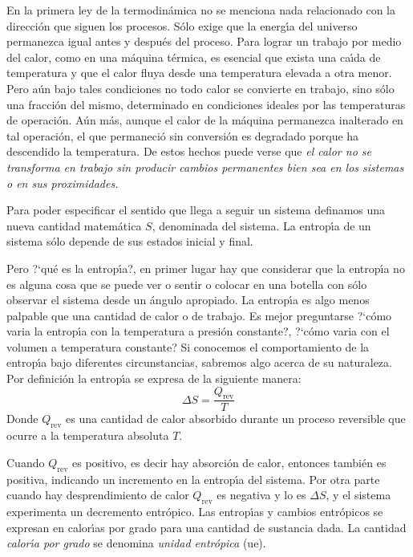  En la primera ley de la termodin\'amica no se menciona nada relacionado con la direcci\'on que siguen los procesos. S\'olo exige que la energ\'{\i}a del universo permanezca igual antes y  despu\'es del proceso. Para lograr un trabajo por medio del calor, como en una m\'aquina t\'ermica, es esencial que exista una ca\'{\i}da de temperatura y que el calor fluya desde una tempe\-ratura elevada a otra menor. Pero a\'un bajo tales condiciones no todo calor se convierte en trabajo, sino s\'olo una fracci\'on del mismo, determinado en condiciones ideales por las temperaturas de operaci\'on. A\'un m\'as, aunque el calor de la m\'aquina permanezca inalterado en tal operaci\'on, el que permaneci\'o sin conversi\'on es degradado porque ha descendido la temperatura. De estos hechos puede verse que \textit{el calor no se transforma en trabajo sin producir cambios permanentes bien sea en los sistemas o en sus proximidades.}

Para poder especificar el sentido que llega a seguir un sistema definamos una nueva cantidad matem\'atica $S$, denominada \textit{} del sistema. La entrop\'{\i}a  de un sistema s\'olo depende de sus estados inicial y final.

Pero ?`qu\'e es la entrop\'{\i}a?, en primer lugar hay que considerar que la entrop\'{\i}a no es alguna cosa que se puede ver o sentir o colocar en una botella con s\'olo observar el sistema desde un \'angulo apropiado. La entrop\'{\i}a es algo menos palpable que una cantidad de calor o de trabajo. Es mejor preguntarse ?`c\'omo varia la entrop\'{\i}a con la temperatura a presi\'on constante?, ?`c\'omo varia con el volumen a temperatura constante? Si conocemos el comportamiento de la entrop\'{\i}a bajo diferentes circunstancias, sabremos algo acerca de su naturaleza.
Por definici\'on la entrop\'{\i}a se expresa de la siguiente manera:
   \begin{equation}
   \Delta S = \frac{Q _{\mathrm{rev}}}{T}
   \end{equation}
Donde $Q _{\mathrm{rev}}$ es una cantidad de calor absorbido durante un proceso reversible que ocurre a
la temperatura absoluta  $T$.

Cuando $Q _{\mathrm{rev}}$ es positivo, es decir hay absorci\'on de calor, entonces tambi\'en  es positiva, indicando un incremento en la entrop\'{\i}a del sistema. Por otra parte cuando hay desprendimiento de calor  $Q _{\mathrm{rev}}$ es negativa y lo es $\Delta S$, y el
sistema experimenta un decremento entr\'opico. Las entrop\'{\i}as y cambios entr\'opicos se expresan en  calor\'{\i}as por grado para una cantidad de sustancia dada. La cantidad \textit{calor\'{\i}a por grado} se denomina \textit{unidad
entr\'opica} (ue).

